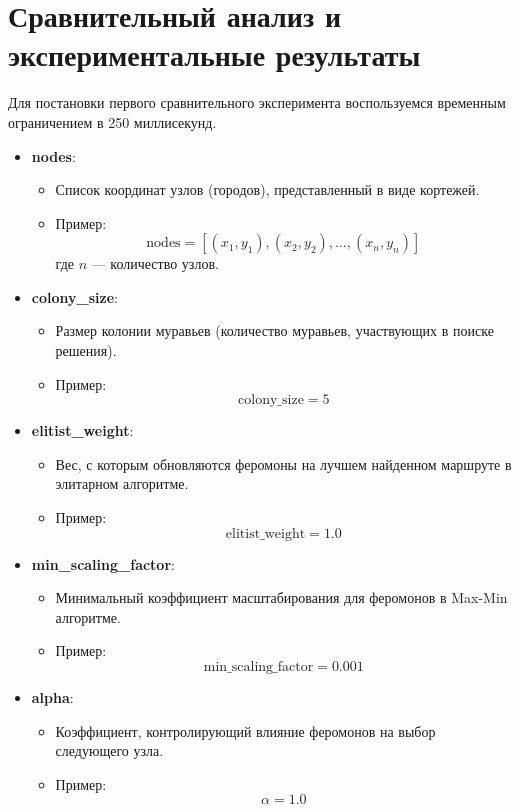 \documentclass[14pt]{article}
\begin{document}
\section{Сравнительный анализ и экспериментальные результаты}

Для постановки первого сравнительного эксперимента воспользуемся временным ограничением в 250 миллисекунд.\\

\begin{itemize}
    \item \textbf{nodes}:
    \begin{itemize}
        \item Список координат узлов (городов), представленный в виде кортежей.
        \item Пример: 
        \[
        \text{nodes} = [(x_1, y_1), (x_2, y_2), \ldots, (x_n, y_n)]
        \]
        где \(n\) — количество узлов.
    \end{itemize}
    
    \item \textbf{colony\_size}:
    \begin{itemize}
        \item Размер колонии муравьев (количество муравьев, участвующих в поиске решения).
        \item Пример: 
        \[
        \text{colony\_size} = 5
        \]
    \end{itemize}
    
    \item \textbf{elitist\_weight}:
    \begin{itemize}
        \item Вес, с которым обновляются феромоны на лучшем найденном маршруте в элитарном алгоритме.
        \item Пример: 
        \[
        \text{elitist\_weight} = 1.0
        \]
    \end{itemize}
    
    \item \textbf{min\_scaling\_factor}:
    \begin{itemize}
        \item Минимальный коэффициент масштабирования для феромонов в Max-Min алгоритме.
        \item Пример: 
        \[
        \text{min\_scaling\_factor} = 0.001
        \]
    \end{itemize}
    
    \item \textbf{alpha}:
    \begin{itemize}
        \item Коэффициент, контролирующий влияние феромонов на выбор следующего узла.
        \item Пример: 
        \[
        \alpha = 1.0
        \]
    \end{itemize}
    

\end{itemize}
\end{document}
